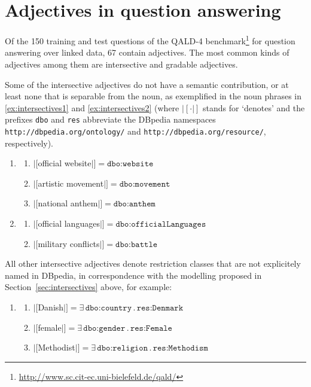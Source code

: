 \documentclass[11pt]{article}
\begin{document}
\section{Adjectives in question answering}

Of the 150 training and test questions of the QALD-4 benchmark\footnote{\url{http://www.sc.cit-ec.uni-bielefeld.de/qald/}} 
for question answering over linked data, 67 contain adjectives. 
The most common kinds of adjectives among them are intersective and gradable adjectives.

Some of the intersective adjectives do not have a semantic contribution, or at least none that is separable from the noun, 
as exemplified in the noun phrases in \ref{ex:intersectives1} and \ref{ex:intersectives2} (where $|[\cdot|]$ stands for 
`denotes' and the prefixes \texttt{dbo} and \texttt{res} abbreviate the DBpedia namespaces \texttt{http://dbpedia.org/ontology/} 
and \texttt{http://dbpedia.org/resource/}, respectively).
\begin{enumerate}[resume]
\item \begin{enumerate}
 \item $|[$official website$|]=\texttt{dbo:website}$
 \item $|[$artistic movement$|]=\texttt{dbo:movement}$
 \item $|[$national anthem$|]=\texttt{dbo:anthem}$
 \end{enumerate}
 \label{ex:intersectives1}
\item \begin{enumerate}
 \item $|[$official languages$|]=\texttt{dbo:officialLanguages}$
 \item $|[$military conflicts$|]=\texttt{dbo:battle}$
 \end{enumerate}
 \label{ex:intersectives2}
\end{enumerate}
All other intersective adjectives denote restriction classes that are not explicitely named in DBpedia, 
in correspondence with the modelling proposed in Section~\ref{sec:intersectives} above, for example:
\begin{enumerate}[resume]
\item \begin{enumerate}
 \item $|[$Danish$|]=\exists\,\texttt{dbo:country}\,.\,\texttt{res:Denmark}$
 \item $|[$female$|]=\exists\,\texttt{dbo:gender}\,.\,\texttt{res:Female}$
 \item $|[$Methodist$|]=\exists\,\texttt{dbo:religion}\,.\,\texttt{res:Methodism}$
 \end{enumerate}
\end{enumerate}
\end{document}

